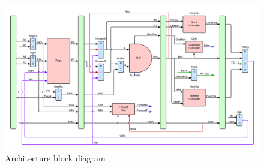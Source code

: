 \begin{figure}

  \centering
  \includegraphics[width=\textwidth]{fpga/fig/fitness_core.png}
  \caption{Architecture block diagram}
  \label{fpga:fig:fitness:fitness_arch}
\end{figure}
